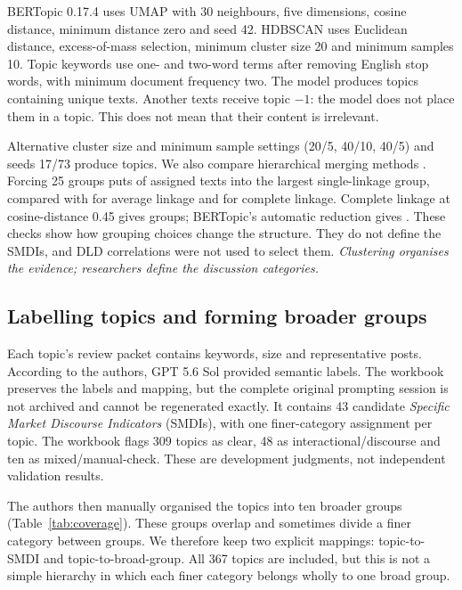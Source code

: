 \documentclass[graybox]{svmult}
\begin{document}
BERTopic 0.17.4 uses UMAP \cite{umap} with 30 neighbours, five dimensions, cosine distance, minimum distance zero and seed 42. HDBSCAN \cite{hdbscan} uses Euclidean distance, excess-of-mass selection, minimum cluster size 20 and minimum samples 10. Topic keywords use one- and two-word terms after removing English stop words, with minimum document frequency two. The model produces \PrimaryTopics{} topics containing \AssignedTexts{} unique texts. Another \NoiseTexts{} texts receive topic $-1$: the model does not place them in a topic. This does not mean that their content is irrelevant.

Alternative cluster size and minimum sample settings (20/5, 40/10, 40/5) and seeds 17/73 produce \AlternativeTopicRange{} topics. We also compare hierarchical merging methods \cite{scipy}. Forcing 25 groups puts \SingleLargest{} of \AssignedTexts{} assigned texts into the largest single-linkage group, compared with \AverageLargest{} for average linkage and \CompleteLargest{} for complete linkage. Complete linkage at cosine-distance 0.45 gives \CompleteGroups{} groups; BERTopic's automatic reduction gives \NativeTopics{} \cite{reduction}. These checks show how grouping choices change the structure. They do not define the SMDIs, and DLD correlations were not used to select them. \emph{Clustering organises the evidence; researchers define the discussion categories.}

\subsection{Labelling topics and forming broader groups}
Each topic's review packet contains keywords, size and representative posts. According to the authors, GPT 5.6 Sol provided semantic labels. The workbook preserves the labels and mapping, but the complete original prompting session is not archived and cannot be regenerated exactly. It contains 43 candidate \emph{Specific Market Discourse Indicators} (SMDIs), with one finer-category assignment per topic. The workbook flags 309 topics as clear, 48 as interactional/discourse and ten as mixed/manual-check. These are development judgments, not independent validation results.

The authors then manually organised the topics into ten broader groups (Table~\ref{tab:coverage}). These groups overlap and sometimes divide a finer category between groups. We therefore keep two explicit mappings: topic-to-SMDI and topic-to-broad-group. All 367 topics are included, but this is not a simple hierarchy in which each finer category belongs wholly to one broad group.
\end{document}
